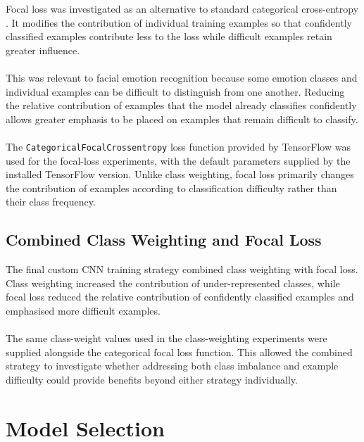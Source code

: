 \documentclass[12pt, a4paper]{report}
\let\oldsection\section
\renewcommand{\section}{%
    \Needspace{6\baselineskip}%
    \oldsection
}
\let\oldsubsection\subsection
\renewcommand{\subsection}{%
    \Needspace{6\baselineskip}%
    \oldsubsection
}
\begin{document}
				Focal loss was investigated as an alternative to standard categorical cross-entropy \cite{lin2017focal}. It modifies the contribution of individual training examples so that confidently classified examples contribute less to the loss while difficult examples retain greater influence.\\\\
				This was relevant to facial emotion recognition because some emotion classes and individual examples can be difficult to distinguish from one another. Reducing the relative contribution of examples that the model already classifies confidently allows greater emphasis to be placed on examples that remain difficult to classify.\\\\
				The \texttt{CategoricalFocalCrossentropy} loss function provided by TensorFlow was used for the focal-loss experiments, with the default parameters supplied by the installed TensorFlow version. Unlike class weighting, focal loss primarily changes the contribution of examples according to classification difficulty rather than their class frequency.
				
			\subsection{Combined Class Weighting and Focal Loss}
				
				The final custom CNN training strategy combined class weighting with focal loss. Class weighting increased the contribution of under-represented classes, while focal loss reduced the relative contribution of confidently classified examples and emphasised more difficult examples.\\\\
				The same class-weight values used in the class-weighting experiments were supplied alongside the categorical focal loss function. This allowed the combined strategy to investigate whether addressing both class imbalance and example difficulty could provide benefits beyond either strategy individually.
				
		\section{Model Selection}
			
\end{document}
